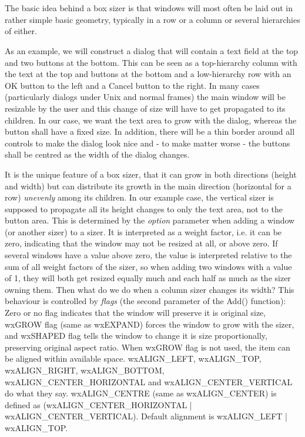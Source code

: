 \section{}\label{wxboxsizer}

The basic idea behind a box sizer is that windows will most often be laid out in rather
simple basic geometry, typically in a row or a column or several hierarchies of either.

As an example, we will construct a dialog that will contain a text field at the top and
two buttons at the bottom. This can be seen as a top-hierarchy column with the text at
the top and buttons at the bottom and a low-hierarchy row with an OK button to the left
and a Cancel button to the right. In many cases (particularly dialogs under Unix and
normal frames) the main window will be resizable by the user and this change of size
will have to get propagated to its children. In our case, we want the text area to grow
with the dialog, whereas the button shall have a fixed size. In addition, there will be
a thin border around all controls to make the dialog look nice and - to make matter worse -
the buttons shall be centred as the width of the dialog changes.

It is the unique feature of a box sizer, that it can grow in both directions (height and
width) but can distribute its growth in the main direction (horizontal for a row) {\it unevenly} 
among its children. In our example case, the vertical sizer is supposed to propagate all its
height changes to only the text area, not to the button area. This is determined by the {\it option} parameter
when adding a window (or another sizer) to a sizer. It is interpreted
as a weight factor, i.e. it can be zero, indicating that the window may not be resized
at all, or above zero. If several windows have a value above zero, the value is interpreted
relative to the sum of all weight factors of the sizer, so when adding two windows with
a value of 1, they will both get resized equally much and each half as much as the sizer
owning them. Then what do we do when a column sizer changes its width? This behaviour is
controlled by {\it flags} (the second parameter of the Add() function): Zero or no flag
indicates that the window will preserve it is original size, wxGROW flag (same as wxEXPAND)
forces the window to grow with the sizer, and wxSHAPED flag tells the window to change it is
size proportionally, preserving original aspect ratio.  When wxGROW flag is not used,
the item can be aligned within available space.  wxALIGN\_LEFT, wxALIGN\_TOP, wxALIGN\_RIGHT,
wxALIGN\_BOTTOM, wxALIGN\_CENTER\_HORIZONTAL and wxALIGN\_CENTER\_VERTICAL do what they say.
wxALIGN\_CENTRE (same as wxALIGN\_CENTER) is defined as (wxALIGN\_CENTER\_HORIZONTAL |
wxALIGN\_CENTER\_VERTICAL).  Default alignment is wxALIGN\_LEFT | wxALIGN\_TOP.

